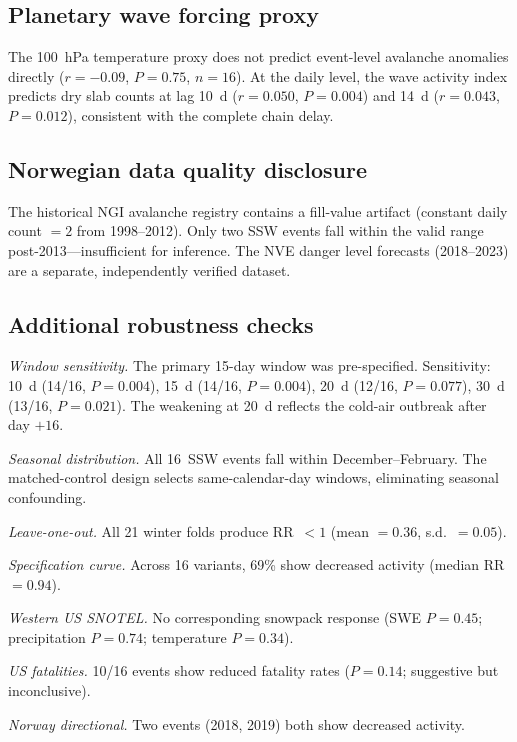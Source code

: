 \documentclass[11pt,a4paper]{article}
\begin{document}
\subsection{Planetary wave forcing proxy}

The 100~hPa temperature proxy does not predict event-level avalanche anomalies directly ($r = -0.09$, $P = 0.75$, $n = 16$). At the daily level, the wave activity index predicts dry slab counts at lag 10~d ($r = 0.050$, $P = 0.004$) and 14~d ($r = 0.043$, $P = 0.012$), consistent with the complete chain delay.

\subsection{Norwegian data quality disclosure}

The historical NGI avalanche registry contains a fill-value artifact (constant daily count $= 2$ from 1998--2012). Only two SSW events fall within the valid range post-2013---insufficient for inference. The NVE danger level forecasts (2018--2023) are a separate, independently verified dataset.

\subsection{Additional robustness checks}

\textit{Window sensitivity.} The primary 15-day window was pre-specified. Sensitivity: 10~d (14/16, $P = 0.004$), 15~d (14/16, $P = 0.004$), 20~d (12/16, $P = 0.077$), 30~d (13/16, $P = 0.021$). The weakening at 20~d reflects the cold-air outbreak after day $+16$.

\textit{Seasonal distribution.} All 16~SSW events fall within December--February. The matched-control design selects same-calendar-day windows, eliminating seasonal confounding.

\textit{Leave-one-out.} All 21 winter folds produce RR~$< 1$ (mean $= 0.36$, s.d.~$= 0.05$).

\textit{Specification curve.} Across 16 variants, 69\% show decreased activity (median RR~$= 0.94$).

\textit{Western US SNOTEL.} No corresponding snowpack response (SWE $P = 0.45$; precipitation $P = 0.74$; temperature $P = 0.34$).

\textit{US fatalities.} 10/16 events show reduced fatality rates ($P = 0.14$; suggestive but inconclusive).

\textit{Norway directional.} Two events (2018, 2019) both show decreased activity.
\end{document}
